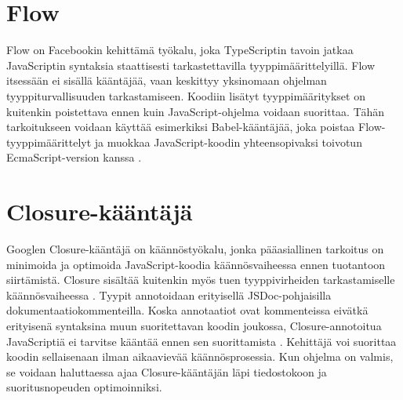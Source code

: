 \section{Flow}
Flow on Facebookin kehittämä työkalu, joka TypeScriptin tavoin jatkaa
JavaScriptin syntaksia staattisesti tarkastettavilla tyyppimäärittelyillä.
Flow itsessään ei sisällä kääntäjää, vaan keskittyy yksinomaan ohjelman
tyyppiturvallisuuden tarkastamiseen. Koodiin lisätyt tyyppimääritykset on
kuitenkin poistettava ennen kuin JavaScript-ohjelma voidaan suorittaa. Tähän
tarkoitukseen voidaan käyttää esimerkiksi Babel-kääntäjää, joka poistaa
Flow-tyyppimäärittelyt ja muokkaa JavaScript-koodin yhteensopivaksi toivotun
EcmaScript-version kanssa \cite{FlowInstallation}.

\section{Closure-kääntäjä}
Googlen Closure-kääntäjä on käännöstyökalu, jonka pääasiallinen tarkoitus
on minimoida ja optimoida JavaScript-koodia käännösvaiheessa ennen tuotantoon
siirtämistä. Closure sisältää kuitenkin myös tuen tyyppivirheiden
tarkastamiselle käännösvaiheessa \cite{ClosureCompiler}. Tyypit annotoidaan
erityisellä JSDoc-pohjaisilla dokumentaatiokommenteilla. Koska annotaatiot
ovat kommenteissa eivätkä erityisenä syntaksina muun suoritettavan koodin
joukossa, Closure-annotoitua JavaScriptiä ei tarvitse kääntää ennen sen
suorittamista \cite{annotatingJSforClosure}. Kehittäjä voi suorittaa koodin
sellaisenaan ilman aikaavievää käännösprosessia. Kun ohjelma on valmis,
se voidaan haluttaessa ajaa Closure-kääntäjän läpi tiedostokoon
ja suoritusnopeuden optimoinniksi.
